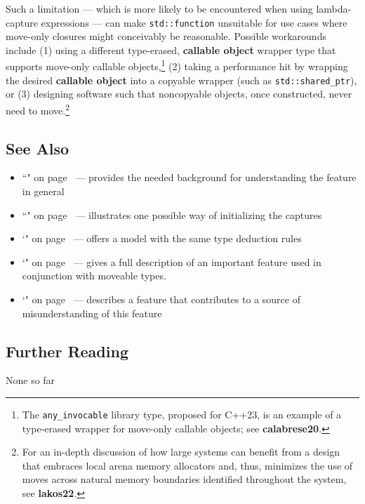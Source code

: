 \noindent Such a limitation --- which is more likely to be encountered when using
lambda-capture expressions --- can make \texttt{std::function}
unsuitable for use cases where move-only closures might conceivably be
reasonable. Possible workarounds include (1) using a different
type-erased, \textbf{callable object} wrapper type that supports
move-only callable objects,{\cprotect\footnote{The
\texttt{any\_invocable} library type, proposed for C++23, is an
example of a type-erased wrapper for move-only callable objects; see
\textbf{calabrese20}.}} (2) taking a performance hit by wrapping the
desired \textbf{callable object} into a copyable wrapper (such as
\texttt{std::shared\_ptr}), or (3) designing software such that
noncopyable objects, once constructed, never need to
move.\footnote{For an in-depth discussion of how large systems can
benefit from a design that embraces local arena memory allocators and,
thus, minimizes the use of moves across natural memory boundaries
identified throughout the system, see \textbf{lakos22}.}

\subsection[See Also]{See Also}\label{see-also}

\begin{itemize}
\item{``" on page~\pageref{lambda} — provides the needed background for understanding the feature in general}
\item{``" on page~\pageref{bracedinit} — illustrates one possible way of initializing the captures}
\item{`" on page~\pageref{auto-feature} — offers a model with the same type deduction rules}
\item{`" on page~\pageref{Rvalue-References} — gives a full description of an important feature used in conjunction with moveable types.}
\item{`" on page~\pageref{forwardingref} — describes a feature that contributes to a source of misunderstanding of this feature}
\end{itemize}

\subsection[Further Reading]{Further Reading}\label{further-reading}

None so far


